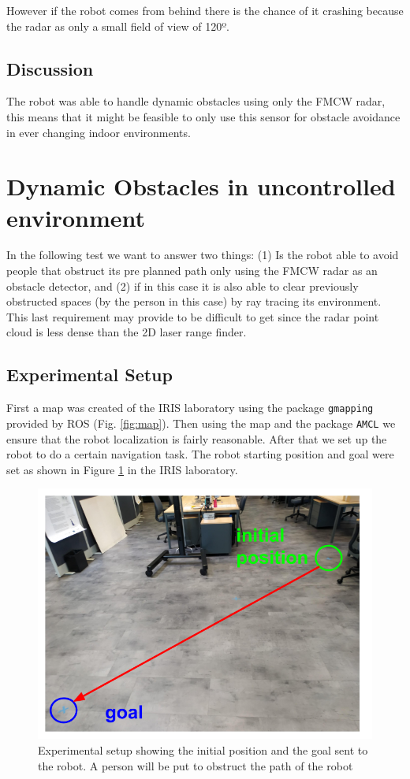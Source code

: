 However if the robot comes from behind there is the chance of it crashing because the radar as only a small field of view of 120º.
\subsection{Discussion}
The robot was able to handle dynamic obstacles using only the \ac{FMCW} \ac{radar}, this means that it might be feasible to only use this sensor for obstacle avoidance in ever changing indoor environments.

\section {Dynamic Obstacles in uncontrolled environment}
In the following test we want to answer two things: (1) Is the robot able to avoid people that obstruct its pre planned path only using the  \ac{FMCW} radar as an obstacle detector, and (2) if in this case it is also able to clear previously obstructed spaces (by the person in this case) by ray tracing its environment. This last requirement may provide to be difficult to get since the radar point cloud is less dense than the 2D laser range finder.

\subsection{Experimental Setup}
First a map was created of the \ac{IRIS} laboratory using the package \texttt{gmapping} provided by \ac{ROS} (Fig. \ref{fig:map}). Then using the map and the package \texttt{\ac{AMCL}} we ensure that the robot localization is fairly reasonable. After that we set up the robot to do a certain navigation task.
The robot starting position and goal were set as shown in Figure \ref{fig:setup} in the \ac{IRIS} laboratory. 

\begin{figure}[ht!]
\centerline{\includegraphics [width=0.8 \textwidth]{imgs/chapter5/setup.png}}
\caption[Experimental setup]{Experimental setup showing the initial position and the goal sent to the robot. A person will be put to obstruct the path of the robot}
\label{fig:setup}
\end{figure}


